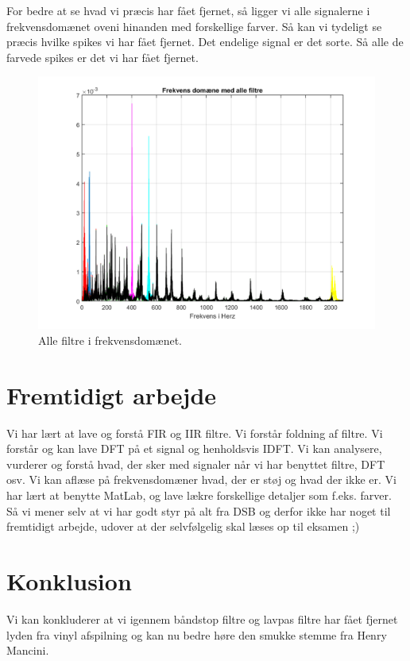 \documentclass[12pt, letterpaper]{article}
\begin{document}
\newpage
For bedre at se hvad vi præcis har fået fjernet, så ligger vi alle signalerne i frekvensdomænet oveni hinanden med forskellige farver. Så kan vi tydeligt se præcis hvilke spikes vi har fået fjernet. Det endelige signal er det sorte. Så alle de farvede spikes er det vi har fået fjernet. 
\begin{figure}[H]
           \includegraphics[width=\linewidth]{billeder/Vinyldom}	   							\caption{Alle filtre i frekvensdomænet.}
\end{figure}


\section{Fremtidigt arbejde}
Vi har lært at lave og forstå FIR og IIR filtre. Vi forstår foldning af filtre. Vi forstår og kan lave DFT på et signal og henholdsvis IDFT. 
Vi kan analysere, vurderer og forstå hvad, der sker med signaler når vi har benyttet filtre, DFT osv. Vi kan aflæse på frekvensdomæner hvad, der er støj og hvad der ikke er. 
Vi har lært at benytte MatLab, og lave lækre forskellige detaljer som f.eks. farver. 
Så vi mener selv at vi har godt styr på alt fra DSB og derfor ikke har noget til fremtidigt arbejde, udover at der selvfølgelig skal læses op til eksamen ;)

\newpage
\section{Konklusion}
Vi kan konkluderer at vi igennem båndstop filtre og lavpas filtre har fået fjernet lyden fra vinyl afspilning og kan nu bedre høre den smukke stemme fra Henry Mancini. 
\end{document}
